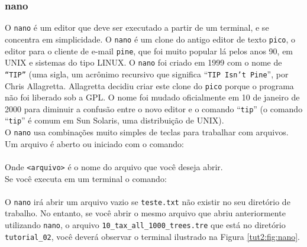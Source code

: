 \begin{refsection}

\subsubsection{nano}\label{tut2:text:editors:nano}

O \texttt{nano} é um editor que deve ser executado a partir de um terminal, e se concentra em simplicidade. O \texttt{nano} é um clone do antigo editor de texto \texttt{pico}, o editor para o cliente de e-mail \texttt{pine}, que foi muito popular lá pelos anos 90, em UNIX e sistemas do tipo LINUX. O \texttt{nano} foi criado em 1999 com o nome de \texttt{``TIP''} (uma sigla, um acrônimo recursivo que significa ``\texttt{TIP Isn't Pine}'', por Chris Allagretta. Allagretta decidiu criar este clone do \texttt{pico} porque o programa não foi liberado sob a GPL. O nome foi mudado oficialmente em 10 de janeiro de 2000 para diminuir a confusão entre o novo editor e o comando ``\texttt{tip}'' (o comando ``\texttt{tip}'' é comum em Sun Solaris, uma distribuição de UNIX).\\
O \texttt{nano} usa combinações muito simples de teclas para trabalhar com arquivos. Um arquivo é aberto ou iniciado com o comando: \\

\\

Onde \texttt{<arquivo>} é o nome do arquivo que você deseja abrir.\\
Se você executa em um terminal o comando:\\

\\


O \texttt{nano} irá abrir um arquivo vazio se \texttt{teste.txt} não existir no seu diretório de trabalho. No entanto, se você abrir o mesmo arquivo que abriu anteriormente utilizando \texttt{nano}, o arquivo \texttt{10\_tax\_all\_1000\_trees.tre} que está no diretório \texttt{tutorial\_02}, você deverá observar o terminal ilustrado na Figura \ref{tut2:fig:nano}.\\


\end{refsection}
